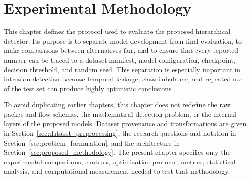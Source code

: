%
%
\providecommand{\ExpPlatform}{Google Colaboratory Pro+}
\providecommand{\ExpComputeBudget}{600 purchased compute units}
\providecommand{\ExpGPU}{NVIDIA T4 (16~GB) or NVIDIA L4 (24~GB); exact model recorded per run}
\providecommand{\ExpCPU}{\textit{[insert CPU model and RAM]}}
\providecommand{\ExpOS}{Google Colab hosted Linux runtime; \textit{[insert runtime image details]}}
\providecommand{\ExpSoftware}{\textit{[insert Python, PyTorch, CUDA, and scikit-learn versions]}}
\providecommand{\ExpSuricata}{\textit{[insert Suricata version and custom-plugin revision]}}

\chapter{Experimental Methodology}
\label{sec:experimental_methodology}

This chapter defines the protocol used to evaluate the proposed hierarchical
detector. Its purpose is to separate model development from final evaluation,
to make comparisons between alternatives fair, and to ensure that every
reported number can be traced to a dataset manifest, model configuration,
checkpoint, decision threshold, and random seed. This separation is especially
important in intrusion detection because temporal leakage, class imbalance,
and repeated use of the test set can produce highly optimistic conclusions
\cite{SommerPaxson2010,Arp2022DosDonts}.

To avoid duplicating earlier chapters, this chapter does not redefine the raw
packet and flow schemas, the mathematical detection problem, or the internal
layers of the proposed models. Dataset provenance and transformations are
given in Section~\ref{sec:dataset_preprocessing}, the research questions and
notation in Section~\ref{sec:problem_formulation}, and the architecture in
Section~\ref{sec:proposed_methodology}. The present chapter specifies only the
experimental comparisons, controls, optimization protocol, metrics,
statistical analysis, and computational measurement needed to test that
methodology.

